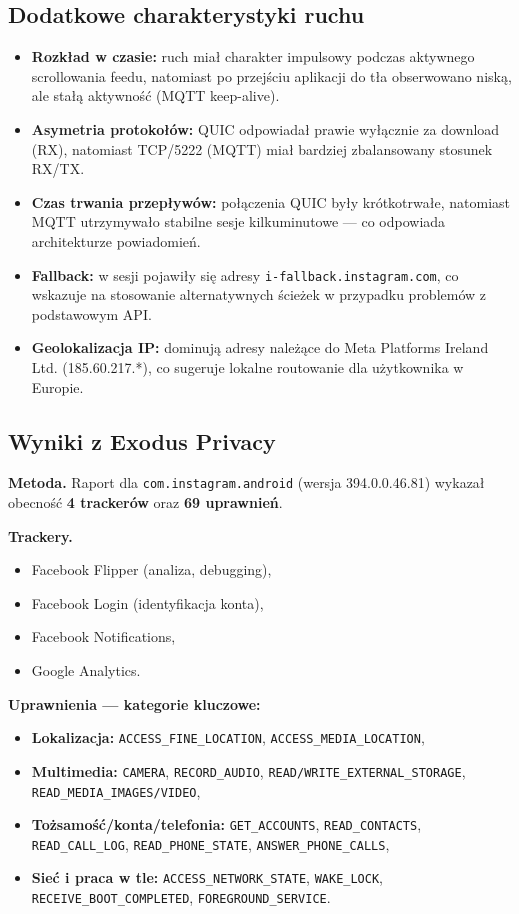 \subsection{Dodatkowe charakterystyki ruchu}
\begin{itemize}
  \item \textbf{Rozkład w czasie:} ruch miał charakter impulsowy podczas aktywnego scrollowania feedu, natomiast po przejściu aplikacji do tła obserwowano niską, ale stałą aktywność (MQTT keep-alive).
  \item \textbf{Asymetria protokołów:} QUIC odpowiadał prawie wyłącznie za download (RX), natomiast TCP/5222 (MQTT) miał bardziej zbalansowany stosunek RX/TX.
  \item \textbf{Czas trwania przepływów:} połączenia QUIC były krótkotrwałe, natomiast MQTT utrzymywało stabilne sesje kilkuminutowe — co odpowiada architekturze powiadomień.
  \item \textbf{Fallback:} w sesji pojawiły się adresy \texttt{i-fallback.instagram.com}, co wskazuje na stosowanie alternatywnych ścieżek w przypadku problemów z podstawowym API.
  \item \textbf{Geolokalizacja IP:} dominują adresy należące do Meta Platforms Ireland Ltd. (185.60.217.*), co sugeruje lokalne routowanie dla użytkownika w Europie.
\end{itemize}

\subsection{Wyniki z Exodus Privacy \cite{ExodusPrivacy}}
\textbf{Metoda.} Raport dla \texttt{com.instagram.android} (wersja 394.0.0.46.81) wykazał obecność \textbf{4 trackerów} oraz \textbf{69 uprawnień}.

\textbf{Trackery.}
\begin{itemize}
  \item Facebook Flipper (analiza, debugging),
  \item Facebook Login (identyfikacja konta),
  \item Facebook Notifications,
  \item Google Analytics.
\end{itemize}

\textbf{Uprawnienia — kategorie kluczowe:}
\begin{itemize}
  \item \textbf{Lokalizacja:} \texttt{ACCESS\_FINE\_LOCATION}, \texttt{ACCESS\_MEDIA\_LOCATION},
  \item \textbf{Multimedia:} \texttt{CAMERA}, \texttt{RECORD\_AUDIO}, \texttt{READ/WRITE\_EXTERNAL\_STORAGE}, \texttt{READ\_MEDIA\_IMAGES/VIDEO},
  \item \textbf{Tożsamość/konta/telefonia:} \texttt{GET\_ACCOUNTS}, \texttt{READ\_CONTACTS}, \texttt{READ\_CALL\_LOG}, \texttt{READ\_PHONE\_STATE}, \texttt{ANSWER\_PHONE\_CALLS},
  \item \textbf{Sieć i praca w tle:} \texttt{ACCESS\_NETWORK\_STATE}, \texttt{WAKE\_LOCK}, \texttt{RECEIVE\_BOOT\_COMPLETED}, \texttt{FOREGROUND\_SERVICE}.
\end{itemize}

